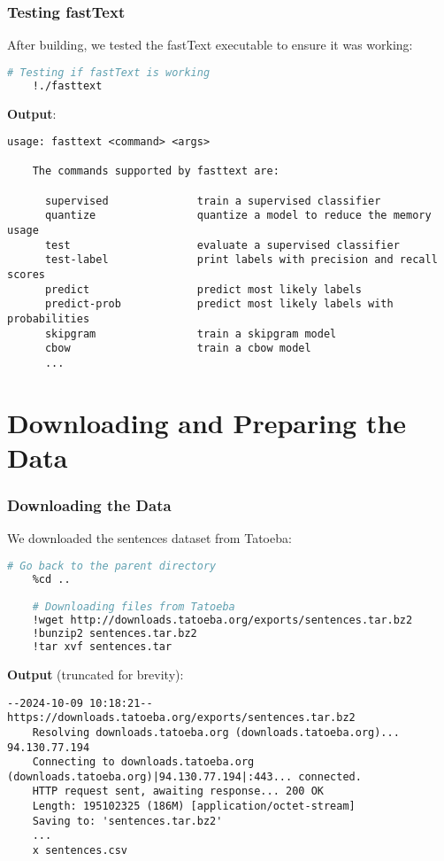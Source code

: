 \documentclass{beamer}
\begin{document}
\begin{frame}[fragile]
    \frametitle{Testing fastText}
    After building, we tested the fastText executable to ensure it was working:
    \begin{lstlisting}[language=bash]
    # Testing if fastText is working
    !./fasttext
    \end{lstlisting}
    \textbf{Output}:
    \begin{lstlisting}[basicstyle=\ttfamily\scriptsize]
    usage: fasttext <command> <args>

    The commands supported by fasttext are:

      supervised              train a supervised classifier
      quantize                quantize a model to reduce the memory usage
      test                    evaluate a supervised classifier
      test-label              print labels with precision and recall scores
      predict                 predict most likely labels
      predict-prob            predict most likely labels with probabilities
      skipgram                train a skipgram model
      cbow                    train a cbow model
      ...
    \end{lstlisting}
\end{frame}

\section{Downloading and Preparing the Data}

\begin{frame}[fragile]
    \frametitle{Downloading the Data}
    We downloaded the sentences dataset from Tatoeba:
    \begin{lstlisting}[language=bash]
    # Go back to the parent directory
    %cd ..

    # Downloading files from Tatoeba
    !wget http://downloads.tatoeba.org/exports/sentences.tar.bz2
    !bunzip2 sentences.tar.bz2
    !tar xvf sentences.tar
    \end{lstlisting}
    \textbf{Output} (truncated for brevity):
    \begin{lstlisting}[basicstyle=\ttfamily\scriptsize]
    --2024-10-09 10:18:21--  https://downloads.tatoeba.org/exports/sentences.tar.bz2
    Resolving downloads.tatoeba.org (downloads.tatoeba.org)... 94.130.77.194
    Connecting to downloads.tatoeba.org (downloads.tatoeba.org)|94.130.77.194|:443... connected.
    HTTP request sent, awaiting response... 200 OK
    Length: 195102325 (186M) [application/octet-stream]
    Saving to: 'sentences.tar.bz2'
    ...
    x sentences.csv
    \end{lstlisting}
\end{frame}
\end{document}
